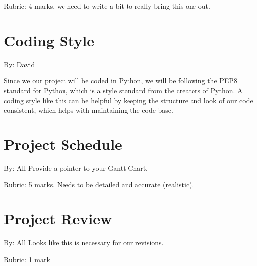 \documentclass{article}
\begin{document}
Rubric:  4 marks, we need to write a bit to really bring this one out.

\section{Coding Style}
By: David

Since we our project will be coded in Python, we will be following the PEP8 
standard for Python, which is a style standard from the creators of Python.
A coding style like this can be helpful by keeping the structure and look of 
our code consistent, which helps with maintaining the code base.



\section{Project Schedule}
By: All
Provide a pointer to your Gantt Chart.

Rubric:  5 marks.  Needs to be detailed and accurate (realistic).

\section{Project Review}
By: All
Looks like this is necessary for our revisions.

Rubric:  1 mark
\end{document}
